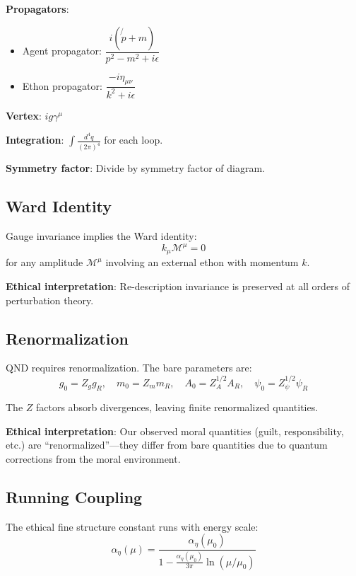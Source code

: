 \documentclass[12pt]{article}
\begin{document}
\textbf{Propagators}:
\begin{itemize}
    \item Agent propagator: $\dfrac{i(\not{p} + m)}{p^2 - m^2 + i\epsilon}$
    \item Ethon propagator: $\dfrac{-i\eta_{\mu\nu}}{k^2 + i\epsilon}$
\end{itemize}

\textbf{Vertex}: $ig\gamma^\mu$

\textbf{Integration}: $\displaystyle\int \frac{d^4q}{(2\pi)^4}$ for each loop.

\textbf{Symmetry factor}: Divide by symmetry factor of diagram.

\subsection{Ward Identity}

Gauge invariance implies the Ward identity:
\begin{equation}
    k_\mu \mathcal{M}^\mu = 0
\end{equation}
for any amplitude $\mathcal{M}^\mu$ involving an external ethon with momentum $k$.

\textbf{Ethical interpretation}: Re-description invariance is preserved at all orders of perturbation theory.

\subsection{Renormalization}

QND requires renormalization. The bare parameters are:
\begin{equation}
    g_0 = Z_g g_R, \quad m_0 = Z_m m_R, \quad A_0 = Z_A^{1/2} A_R, \quad \psi_0 = Z_\psi^{1/2} \psi_R
\end{equation}

The $Z$ factors absorb divergences, leaving finite renormalized quantities.

\textbf{Ethical interpretation}: Our observed moral quantities (guilt, responsibility, etc.) are ``renormalized''---they differ from bare quantities due to quantum corrections from the moral environment.

\subsection{Running Coupling}

The ethical fine structure constant runs with energy scale:
\begin{equation}
    \alpha_\eta(\mu) = \frac{\alpha_\eta(\mu_0)}{1 - \frac{\alpha_\eta(\mu_0)}{3\pi} \ln(\mu / \mu_0)}
\end{equation}
\end{document}
